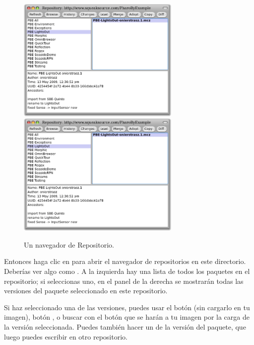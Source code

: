 \documentclass[spanish,a4paper,10pt,twoside]{book}
\begin{document}
\begin{figure}[btp]
	\begin{center}
	\ifluluelse
		{\includegraphics[width=0.7\textwidth]{SqueakSource-PBE}}
		{\includegraphics[width=0.7\textwidth]{SqueakSource-PBE}}
	\end{center}
	\caption{Un navegador de Repositorio.}
\end{figure}
\noindent

Entonces haga clic en  para abrir el navegador de repositorios en este directorio.  Deber\'ias ver algo como .  A la izquierda hay una lista de todos los paquetes en el repositorio; si seleccionas uno, en el panel de la derecha se mostrar\'an todas las versiones del paquete seleccionado en este repositorio.


Si haz seleccionado una de las versiones, puedes usar el bot\'on  (sin cargarlo en tu imagen), bot\'on  , o buscar con el bot\'on  que se har\'an a tu imagen por la carga de la versi\'on seleccionada. Puedes tambi\'en hacer un  de la versi\'on del paquete, que luego puedes escribir en otro repositorio.
\end{document}
